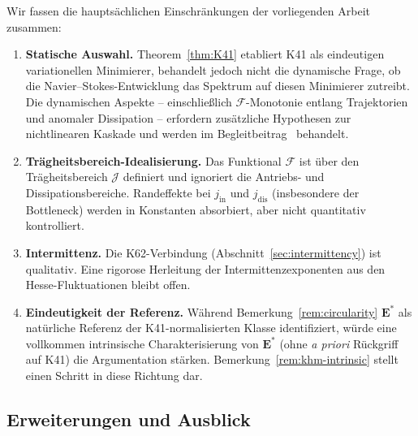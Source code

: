 \documentclass[12pt,a4paper]{article}
\theoremstyle{definition}
\theoremstyle{plain}
\theoremstyle{remark}
\begin{document}
Wir fassen die hauptsächlichen Einschränkungen der vorliegenden Arbeit zusammen:
\begin{enumerate}
\item \textbf{Statische Auswahl.}\; Theorem~\ref{thm:K41} etabliert K41 als eindeutigen variationellen Minimierer, behandelt jedoch nicht die dynamische Frage, ob die Navier--Stokes-Entwicklung das Spektrum auf diesen Minimierer zutreibt. Die dynamischen Aspekte -- einschließlich $\mathcal{F}$-Monotonie entlang Trajektorien und anomaler Dissipation -- erfordern zusätzliche Hypothesen zur nichtlinearen Kaskade und werden im Begleitbeitrag~\cite{Geiger2026b} behandelt.
\item \textbf{Trägheitsbereich-Idealisierung.}\; Das Funktional $\mathcal{F}$ ist über den Trägheitsbereich $\mathcal{J}$ definiert und ignoriert die Antriebs- und Dissipationsbereiche. Randeffekte bei $j_{\mathrm{in}}$ und $j_{\mathrm{dis}}$ (insbesondere der Bottleneck) werden in Konstanten absorbiert, aber nicht quantitativ kontrolliert.
\item \textbf{Intermittenz.}\; Die K62-Verbindung (Abschnitt~\ref{sec:intermittency}) ist qualitativ. Eine rigorose Herleitung der Intermittenzexponenten aus den Hesse-Fluktuationen bleibt offen.
\item \textbf{Eindeutigkeit der Referenz.}\; Während Bemerkung~\ref{rem:circularity} $\mathbf{E}^*$ als natürliche Referenz der K41-normalisierten Klasse identifiziert, würde eine vollkommen intrinsische Charakterisierung von $\mathbf{E}^*$ (ohne \emph{a priori} Rückgriff auf K41) die Argumentation stärken. Bemerkung~\ref{rem:khm-intrinsic} stellt einen Schritt in diese Richtung dar.
\end{enumerate}

\subsection{Erweiterungen und Ausblick}
\end{document}
